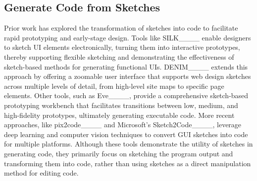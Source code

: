 \subsection{Generate Code from Sketches}
\label{sec:sketch-to-code}
Prior work has explored the transformation of sketches into code to facilitate rapid prototyping and early-stage design. Tools like SILK____ enable designers to sketch UI elements electronically, turning them into interactive prototypes, thereby supporting flexible sketching and demonstrating the effectiveness of sketch-based methods for generating functional UIs. DENIM____ extends this approach by offering a zoomable user interface that supports web design sketches across multiple levels of detail, from high-level site maps to specific page elements.
Other tools, such as Eve____, provide a comprehensive sketch-based prototyping workbench that facilitates transitions between low, medium, and high-fidelity prototypes, ultimately generating executable code. More recent approaches, like pix2code____ and Microsoft's Sketch2Code____, leverage deep learning and computer vision techniques to convert GUI sketches into code for multiple platforms. Although these tools demonstrate the utility of sketches in generating code, they primarily focus on sketching the program output and transforming them into code, rather than using sketches as a direct manipulation method for editing code.

